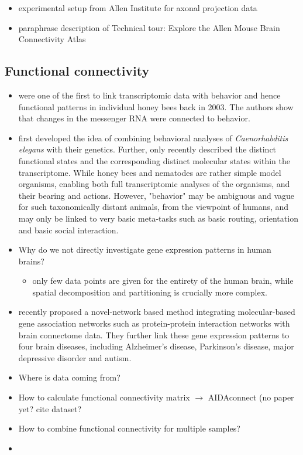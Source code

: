 \documentclass[]{article}
\renewcommand{\cite}{\citep}
\begin{document}
\begin{itemize}
	\item experimental setup from Allen Institute for axonal projection data
	\item paraphrase description of \glqq Technical tour: Explore the Allen Mouse Brain Connectivity Atlas\grqq{}
\end{itemize}



\subsection*{Functional connectivity}
\begin{itemize}
	\item \cite{whitfield2003gene} were one of the first to link transcriptomic data with behavior and hence functional patterns in individual honey bees back in 2003. The authors show that changes in the messenger RNA were connected to behavior.
	\item \cite{rankin2002gene} first developed the idea of combining behavioral analyses of \textit{Caenorhabditis elegans} with their genetics. Further, \cite{sun2021temporal} only recently described the distinct functional states and the corresponding distinct molecular states within the transcriptome. While honey bees and nematodes are rather simple model organisms, enabling both full transcriptomic analyses of the organisms, and their bearing and actions. However, "behavior" may be ambiguous and vague for such taxonomically distant animals, from the viewpoint of humans, and may only be linked to very basic meta-tasks such as basic routing, orientation and basic social interaction. 
	\item Why do we not directly investigate gene expression patterns in human brains?
	\begin{itemize}
		\item only few data points are given for the entirety of the human brain, while spatial decomposition and partitioning is crucially more complex. 
	\end{itemize}
	\item \cite{wang2022network} recently proposed a novel-network based method integrating molecular-based gene association networks such as protein-protein interaction networks with brain connectome data. They further link these gene expression patterns to four brain diseases, including Alzheimer’s disease, Parkinson’s disease, major depressive disorder and autism.
\end{itemize}
\begin{itemize}
	\item Where is data coming from? \cite{AIDAmri2019}
	\item How to calculate functional connectivity matrix $\rightarrow$ AIDAconnect (no paper yet? cite dataset?
	\item How to combine functional connectivity for multiple samples? 
	\item \cite{Zerbi2021}
\end{itemize}
\end{document}
